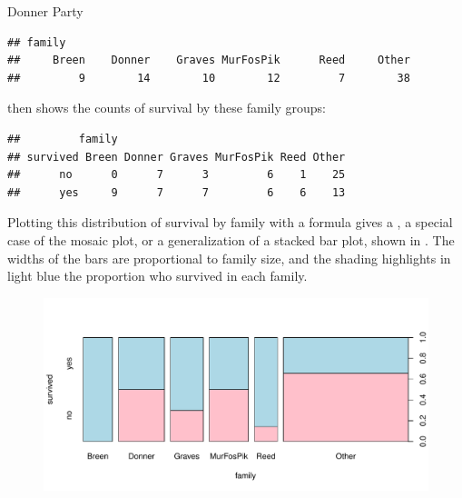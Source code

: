 \documentclass[11pt]{book}
\renewenvironment{knitrout}{\small\renewcommand{\baselinestretch}{.85}}{} %
\begin{document}
\begin{Example}[donner1]{Donner Party}
\begin{knitrout}
\begin{kframe}
\begin{alltt}
 \hlkwb{=} \hlstd{(fam)[}\hlstd{(}\hlstd{,} \hlstd{,} \hlopt{:}\hlstd{,} \hlstd{)])}
\hlopt{$} \hlkwb{<-} 
\hlstd{(}\hlopt{~} 
\end{alltt}
\begin{verbatim}
## family
##     Breen    Donner    Graves MurFosPik      Reed     Other 
##         9        14        10        12         7        38
\end{verbatim}
\end{kframe}
\end{knitrout}
 then shows the counts of survival by these family groups:
\begin{knitrout}
\color{fgcolor}\begin{kframe}
\begin{alltt}
\hlstd{(}\hlopt{~}\hlopt{+} 
\end{alltt}
\begin{verbatim}
##         family
## survived Breen Donner Graves MurFosPik Reed Other
##      no      0      7      3         6    1    25
##      yes     9      7      7         6    6    13
\end{verbatim}
\end{kframe}
\end{knitrout}
Plotting this distribution of  survival by family with a formula gives a , a 
special case of the mosaic plot, or a generalization of a stacked bar plot,
shown in .
The widths of the bars are proportional to family size, and the shading highlights in light blue
the proportion who survived in each family.
\begin{knitrout}
\color{fgcolor}\begin{kframe}
\begin{alltt}
 \hlopt{~}   \hlstd{=}\hlstd{(}\hlstd{,} \hlstd{))}
\end{alltt}
\end{kframe}\begin{figure}[!htbp]


\centerline{\includegraphics[width=.8\textwidth]{ch07/fig/donner1-spineplot} }


\end{figure}
\end{knitrout}
\end{Example}
\end{document}
